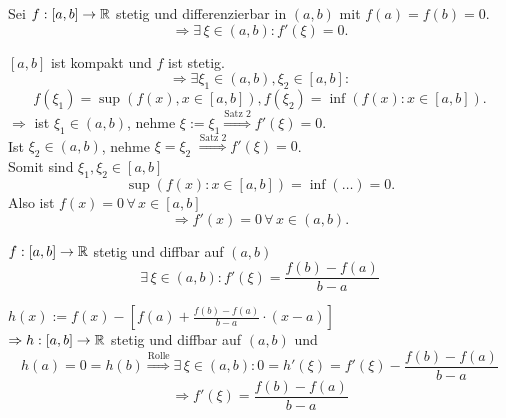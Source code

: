 \documentclass[../ana1.tex]{subfiles}
\begin{document}
\begin{satz}[Rolle]
    Sei \( f: [a,b] \rightarrow \mathbb{R} \) stetig und differenzierbar 
    in \( (a,b) \) mit \( f(a) = f(b) = 0 \).
    \[ \Rightarrow \exists \, \xi \in (a,b) : f'(\xi) = 0. \]
\end{satz}
\begin{bew}
    \( [a,b]\) ist kompakt und \(f\) ist stetig.
    \[ \Rightarrow \exists \xi_1 \in (a,b), \xi_2 \in [a,b]: \]
    \[ f(\xi_1) = \sup( f(x), x \in [a,b] ), f(\xi_2) 
    = \inf (f(x) : x \in [a,b]). \]
    \( \Rightarrow \) ist \( \xi_1 \in (a,b) \), nehme 
    \( \xi := \xi_1 \overset{\text{Satz 2}}{\Rightarrow}
     f'(\xi) = 0 \).\\
    Ist \( \xi_2 \in (a,b) \), nehme \( \xi = \xi_2 \)
    \( \overset{\text{Satz 2}}{\Rightarrow} f'(\xi) = 0 \).\\
    Somit sind \( \xi_1, \xi_2 \in [a,b] \)
    \[ \sup(f(x) : x\in [a,b]) = \inf(\ldots) = 0. \]
    Also ist \( f(x) = 0 \,\forall \, x\in [a,b] \)
    \[ \Rightarrow f'(x) = 0 \, \forall \, x\in (a,b). \]
\end{bew}
\begin{satz}[Mittelwertsatz]
    \( f: [a, b] \rightarrow \mathbb{R} \) stetig und diffbar auf \((a,b)\)
    \[ \exists \, \xi \in (a,b): f'(\xi) = \frac{f(b)-f(a)}{b-a} \]
\end{satz}
\begin{bew}
    \( h(x) :=  f(x) - [f(a) + \frac{f(b)-f(a)}{b-a} \cdot (x-a)] \) \\
    \( \Rightarrow h: [a,b] \rightarrow \mathbb{R} \) stetig und diffbar auf \( (a,b) \) und
    \[ h(a) = 0 = h(b) \overset{\text{Rolle}}{\Rightarrow} 
    \exists \, \xi \in (a,b): 0 = h'(\xi) = f'(\xi) - \frac{f(b)-f(a)}{b-a} \]
    \[ \Rightarrow f'(\xi) = \frac{f(b)-f(a)}{b-a} \]
\end{bew}
\end{document}
